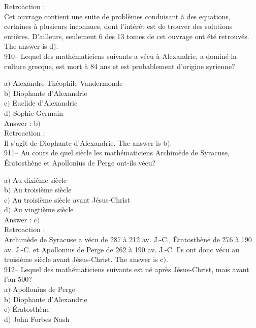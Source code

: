 ﻿\documentclass[letterpaper, 12pt]{article}
\begin{document}
Retroaction : \\
Cet ouvrage contient une suite de probl\`emes conduisant \`a des
equations, certaines \`a plusieurs inconnues, dont l'int\'er\^et
est de trouver des solutions enti\`eres.
D'ailleurs, seulement 6 des 13 tomes de cet ouvrage ont \'et\'e retrouv\'es.
The answer is d$)$.\\

910-- Lequel des math\'ematiciens suivants a v\'ecu \`a Alexandrie,
a domin\'e la culture grecque, est mort \`a 84 ans et est
probablement d'origine syrienne?

a$)$ Alexandre-Th\'eophile Vandermonde \\
b$)$ Diophante d'Alexandrie \\
c$)$ Euclide d'Alexandrie \\
d$)$ Sophie Germain\\

Answer : b$)$\\

Retroaction : \\
Il s'agit de Diophante d'Alexandrie. The answer is b$)$.\\

911-- Au cours de quel si\`ecle les math\'ematiciens Archim\`ede de
Syracuse, \'Eratosth\`ene et Apollonius de Perge ont-ils v\'ecu?

a$)$ Au dixi\`eme si\`ecle \\
b$)$ Au troisi\`eme si\`ecle \\
c$)$ Au troisi\`eme si\`ecle avant J\'esus-Christ \\
d$)$ Au vingti\`eme si\`ecle   \\

Answer : c$)$\\

Retroaction : \\
Archim\`ede de Syracuse a v\'ecu de 287 \`a 212 av. J.-C.,
\'Eratosth\`ene de 276 \`a 190 av. J.-C. et Apollonius de Perge de 262 \`a
190 av. J.-C. Ils ont donc v\'ecu au troisi\`eme si\`ecle avant
J\'esus-Christ. The answer is c$)$.\\

912-- Lequel des math\'ematiciens suivants est n\'e apr\`es J\'esus-Christ,
mais avant l'an 500?\\

a$)$ Apollonius de Perge \\
b$)$ Diophante d'Alexandrie \\
c$)$ \'Eratosth\`ene \\
d$)$ John Forbes Nash  \\
\end{document}
